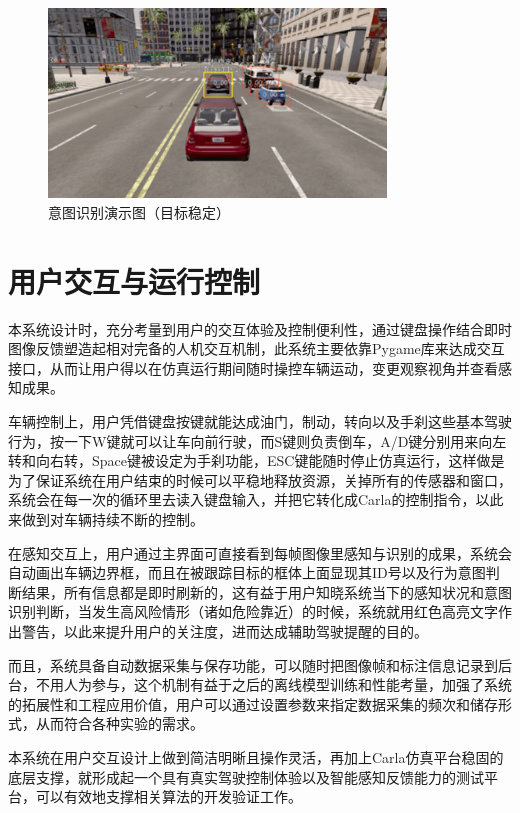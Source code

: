 \begin{figure}[H]
    \centering
    \includegraphics[width=0.8\textwidth]{images/图15 意图识别演示图（目标稳定）.pdf}  %
    \caption{意图识别演示图（目标稳定）}
    \label{fig:example_image}  %
\end{figure}

\section{用户交互与运行控制}

本系统设计时，充分考量到用户的交互体验及控制便利性，通过键盘操作结合即时图像反馈塑造起相对完备的人机交互机制，此系统主要依靠Pygame库来达成交互接口，从而让用户得以在仿真运行期间随时操控车辆运动，变更观察视角并查看感知成果。

车辆控制上，用户凭借键盘按键就能达成油门，制动，转向以及手刹这些基本驾驶行为，按一下W键就可以让车向前行驶，而S键则负责倒车，A/D键分别用来向左转和向右转，Space键被设定为手刹功能，ESC键能随时停止仿真运行，这样做是为了保证系统在用户结束的时候可以平稳地释放资源，关掉所有的传感器和窗口，系统会在每一次的循环里去读入键盘输入，并把它转化成Carla的控制指令，以此来做到对车辆持续不断的控制。

在感知交互上，用户通过主界面可直接看到每帧图像里感知与识别的成果，系统会自动画出车辆边界框，而且在被跟踪目标的框体上面显现其ID号以及行为意图判断结果，所有信息都是即时刷新的，这有益于用户知晓系统当下的感知状况和意图识别判断，当发生高风险情形（诸如危险靠近）的时候，系统就用红色高亮文字作出警告，以此来提升用户的关注度，进而达成辅助驾驶提醒的目的。

而且，系统具备自动数据采集与保存功能，可以随时把图像帧和标注信息记录到后台，不用人为参与，这个机制有益于之后的离线模型训练和性能考量，加强了系统的拓展性和工程应用价值，用户可以通过设置参数来指定数据采集的频次和储存形式，从而符合各种实验的需求。

本系统在用户交互设计上做到简洁明晰且操作灵活，再加上Carla仿真平台稳固的底层支撑，就形成起一个具有真实驾驶控制体验以及智能感知反馈能力的测试平台，可以有效地支撑相关算法的开发验证工作。


